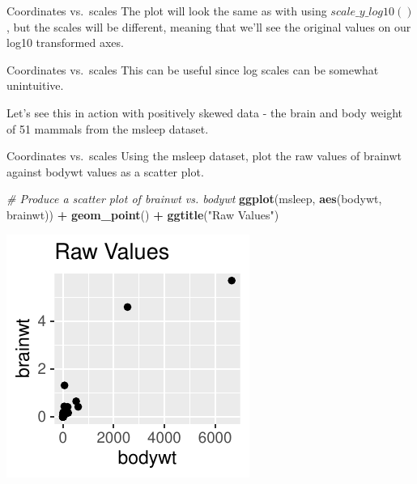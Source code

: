 \documentclass[
  ignorenonframetext,
]{beamer}
\newenvironment{Shaded}{\begin{snugshade}}{\end{snugshade}}
\newcommand{\CommentTok}[1]{\textcolor[rgb]{0.56,0.35,0.01}{\textit{#1}}}
\newcommand{\FunctionTok}[1]{\textcolor[rgb]{0.13,0.29,0.53}{\textbf{#1}}}
\newcommand{\NormalTok}[1]{#1}
\newcommand{\SpecialCharTok}[1]{\textcolor[rgb]{0.81,0.36,0.00}{\textbf{#1}}}
\newcommand{\StringTok}[1]{\textcolor[rgb]{0.31,0.60,0.02}{#1}}
\begin{document}
\begin{frame}{Coordinates vs.~scales}
\label{coordinates-vs.-scales-2}
The plot will look the same as with using \(scale\_y\_log10()\), but the
scales will be different, meaning that we'll see the original values on
our log10 transformed axes.
\end{frame}

\begin{frame}{Coordinates vs.~scales}
\label{coordinates-vs.-scales-3}
This can be useful since log scales can be somewhat unintuitive.

Let's see this in action with positively skewed data - the brain and
body weight of 51 mammals from the msleep dataset.
\end{frame}

\begin{frame}[fragile]{Coordinates vs.~scales}
\label{coordinates-vs.-scales-4}
Using the msleep dataset, plot the raw values of brainwt against bodywt
values as a scatter plot.


\begin{Shaded}
\begin{Highlighting}[]
\CommentTok{\# Produce a scatter plot of brainwt vs. bodywt}
\FunctionTok{ggplot}\NormalTok{(msleep, }\FunctionTok{aes}\NormalTok{(bodywt, brainwt)) }\SpecialCharTok{+} \FunctionTok{geom\_point}\NormalTok{() }\SpecialCharTok{+} \FunctionTok{ggtitle}\NormalTok{(}\StringTok{"Raw Values"}\NormalTok{)}
\end{Highlighting}
\end{Shaded}

\begin{center}\includegraphics[width=0.5\linewidth]{Figs/unnamed-chunk-48-1} \end{center}
\end{frame}
\end{document}
